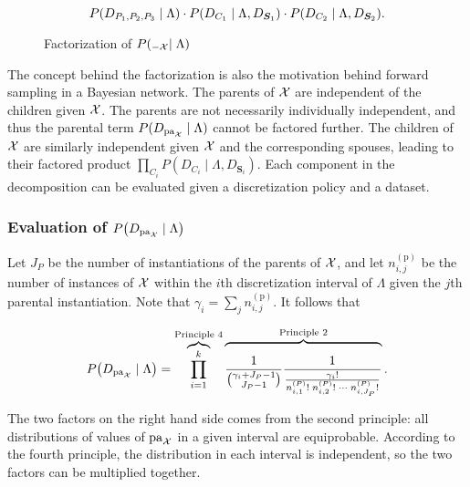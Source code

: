 \begin{equation}
  P\paren{D_{P_1,P_2,P_3} \mid \Lambda} \cdot P\paren{ D_{ C_1 } \mid \Lambda, D_{\bm{S}_1} } \cdot P\paren{D_{C_2} \mid \Lambda, D_{\bm{S}_2}}\text{.}
\end{equation}

\begin{figure}[ht]
  \centering
  
  \caption{Factorization of $P(_{-\mathcal{X}} \mid \Lambda)$}
  \label{fig:example_factorization}
\end{figure}

The concept behind the factorization is also the motivation behind forward sampling in a Bayesian network.
The parents of $\mathcal{X}$ are independent of the children given $\mathcal{X}$.
The parents are not necessarily individually independent, and thus the parental term $P(D_{\operatorname{pa}_{\mathcal{X}}} \mid \Lambda)$ cannot be factored further.
The children of $\mathcal{X}$ are similarly independent given $\mathcal{X}$ and the corresponding spouses, leading to their factored product $\prod_{C_i} P(D_{C_i} \mid \Lambda, D_{\bm{S}_i})$.
Each component in the decomposition can be evaluated given a discretization policy and a dataset.

\subsubsection{Evaluation of $P\paren{D_{\Pa_{\cX}} \mid \Lambda}$}

Let $J_P$ be the number of instantiations of the parents of $\mathcal{X}$, and let $n^{(\text{p})}_{i,j}$ be the number of instances of $\mathcal{X}$ within the $i$th discretization interval of $\Lambda$ given the $j$th parental instantiation.
Note that $\gamma_i = \sum_j n^{(\text{p})}_{i,j}$.
It follows that

\begin{equation}
  \label{eq:likelihood_one}
  P\paren{D_{\Pa_{\cX}} \mid \Lambda} = \overbrace{\prod_{i=1}^k}^{\text{Principle 4}}
    \overbrace{\rule{0pt}{2em}
      \frac{1}{{{\gamma_i + J_P - 1}\choose{J_P - 1}}}
      \frac{1}{
        \frac{
          {\gamma_i}!
        }{
          {n^{({P})}_{i,1}}! \; {n^{({P})}_{i,2}}! \; \cdots \; {n^{({P})}_{i,J_P}}!
        }
      }
    }^{\text{Principle 2}}\text{.}
\end{equation}

The two factors on the right hand side comes from the second principle: all distributions of values of $\operatorname{pa}_{\mathcal{X}}$ in a given interval are equiprobable.
According to the fourth principle, the distribution in each interval is independent, so the two factors can be multiplied together.

